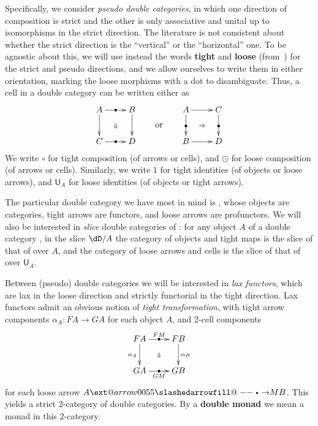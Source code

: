 \documentclass{amsart}
\makeatletter
\def\rightbulletarrowfill@{%
  \slashedarrowfill@\relbar\relbar{\raisebox{1pt}{$\scriptscriptstyle\bullet$}}\rightarrow}
\newcommand\xbulletrightarrow[2][]{%
  \ext@arrow 0055{\rightbulletarrowfill@}{#1}{#2}}
\let\xbto\xbulletrightarrow
\newcommand{\hunit}[1]{\mathsf{U}_{#1}}
\makeatother
\begin{document}
Specifically, we consider \emph{pseudo double categories}, in which one direction of composition is strict and the other is only associative and unital up to isomorphisms in the strict direction.
The literature is not consistent about whether the strict direction is the ``vertical'' or the ``horizontal'' one.
To be agnostic about this, we will use instead the words \textbf{tight} and \textbf{loose} (from~\cite{ls:limlax}) for the strict and pseudo directions, and we allow ourselves to write them in either orientation, marking the loose morphisms with a dot to disambiguate.
Thus, a cell in a double category can be written either as
\[ \vcenter{\xymatrix{ A \ar[r]|{\bullet} \ar[d] \ar@{}[dr]|{\Downarrow}& B \ar[d] \\ C \ar[r]|{\bullet} & D } }
\qquad\text{or}\qquad
\vcenter{\xymatrix{ A \ar[d]|{\bullet} \ar[r] \ar@{}[dr]|{\Rightarrow}& C \ar[d]|{\bullet} \\ B \ar[r] & D } }
\]
We write $\circ$ for tight composition (of arrows or cells), and $\odot$ for loose composition (of arrows or cells).
Similarly, we write $1$ for tight identities (of objects or loose arrows), and $\hunit{A}$ for loose identities (of objects or tight arrows).

The particular double category we have most in mind is \dCat, whose objects are categories, tight arrows are functors, and loose arrows are profunctors.
We will also be interested in \emph{slice} double categories of \dCat: for any object $A$ of a double category \dD, in the slice $\dD/A$ the category of objects and tight maps is the slice of that of \dD over $A$, and the category of loose arrows and cells is the slice of that of \dD over $\hunit A$.

Between (pseudo) double categories we will be interested in \emph{lax functors}, which are lax in the loose direction and strictly functorial in the tight direction.
Lax functors admit an obvious notion of \emph{tight transformation}, with tight arrow components $\alpha_A:FA\to GA$ for each object $A$, and 2-cell components
\[ \vcenter{\xymatrix{ FA \ar[r]|{\bullet}^{FM} \ar[d]_{\alpha_A} \ar@{}[dr]|{\Downarrow}& FB \ar[d]^{\alpha_B} \\ GA \ar[r]|{\bullet}_{GM} & GB } } \]
for each loose arrow $A\xbto{M} B$.
This yields a strict 2-category of double categories.
By a \textbf{double monad} we mean a monad in this 2-category.
\end{document}
